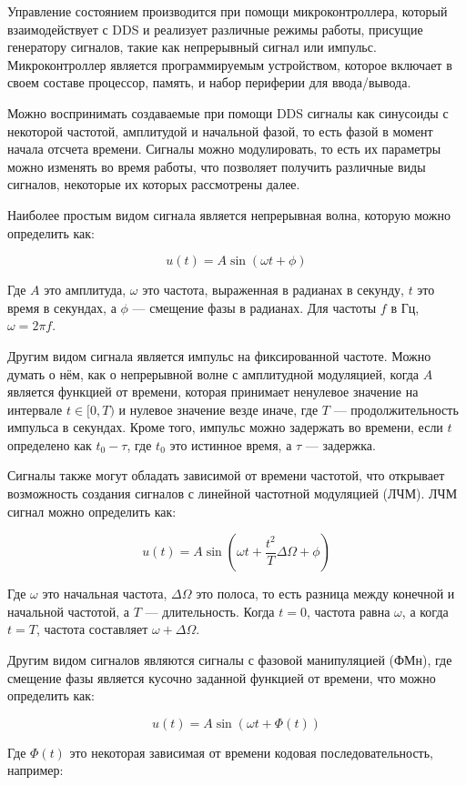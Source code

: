 \documentclass{report}
\begin{document}
Управление состоянием производится при помощи микроконтроллера, который взаимодействует с DDS и реализует различные режимы работы, присущие генератору сигналов, такие как непрерывный сигнал или импульс. Микроконтроллер является программируемым устройством, которое включает в своем составе процессор, память, и набор периферии для ввода/вывода.

Можно воспринимать создаваемые при помощи DDS сигналы как синусоиды с некоторой частотой, амплитудой и начальной фазой, то есть фазой в момент начала отсчета времени. Сигналы можно модулировать, то есть их параметры можно изменять во время работы, что позволяет получить различные виды сигналов, некоторые их которых рассмотрены далее.

Наиболее простым видом сигнала является непрерывная волна, которую можно определить как:

$$
u(t) = A \sin (\omega t + \phi)
$$

Где $A$ это амплитуда, $\omega$ это частота, выраженная в радианах в секунду, $t$ это время в секундах, а $\phi$ --- смещение фазы в радианах. Для частоты $f$ в Гц, $\omega = 2 \pi f$.

Другим видом сигнала является импульс на фиксированной частоте. Можно думать о нём, как о непрерывной волне с амплитудной модуляцией, когда $A$ является функцией от времени, которая принимает ненулевое значение на интервале $t \in [0, T)$ и нулевое значение везде иначе, где $T$ --- продолжительность импульса в секундах. Кроме того, импульс можно задержать во времени, если $t$ определено как $t_0 - \tau$, где $t_0$ это истинное время, а $\tau$ --- задержка.

Сигналы также могут обладать зависимой от времени частотой, что открывает возможность создания сигналов с линейной частотной модуляцией (ЛЧМ). ЛЧМ сигнал можно определить как:

$$
u(t) = A \sin (\omega t + \frac{t^2}{T} \Delta \Omega + \phi)
$$

Где $\omega$ это начальная частота, $\Delta \Omega$ это полоса, то есть разница между конечной и начальной частотой, а $T$ --- длительность. Когда $t=0$, частота равна $\omega$, а когда $t=T$, частота составляет $\omega + \Delta \Omega$.

Другим видом сигналов являются сигналы с фазовой манипуляцией (ФМн), где смещение фазы является кусочно заданной функцией от времени, что можно определить как:

$$
u(t) = A \sin (\omega t + \Phi(t))
$$

Где $\Phi(t)$ это некоторая зависимая от времени кодовая последовательность, например:
\end{document}
